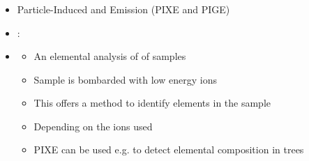 \begin{frame}
\frametitle{\texorpdfstring{\culine[\sectiontitleulinecolor]{\sectiontitle}}{\sectiontitle} }

\begin{itemize}
	\item Particle-Induced  and  Emission (PIXE and PIGE)
\item {}: 
\item[] \begin{itemize}
	 \item An elemental analysis of  of samples  
	 \item Sample is bombarded with low energy ions  
	 
	 \item This offers a method to identify elements in the sample 
	 
	 \item Depending on the ions used
	 
	 \item PIXE can be used e.g. to detect elemental composition in trees   
\end{itemize}

%
\end{itemize}


\endofslide 
\end{frame}

